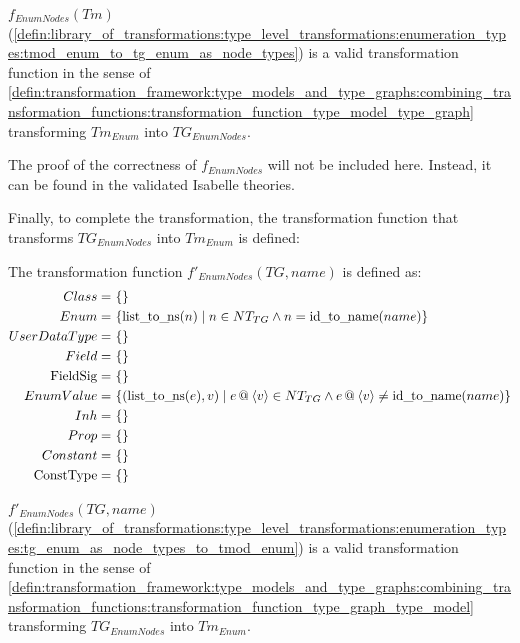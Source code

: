 \begin{thm}
\label{defin:library_of_transformations:type_level_transformations:enumeration_types:tmod_enum_to_tg_enum_as_node_types_func}
$f_{EnumNodes}(Tm)$ (\cref{defin:library_of_transformations:type_level_transformations:enumeration_types:tmod_enum_to_tg_enum_as_node_types}) is a valid transformation function in the sense of \cref{defin:transformation_framework:type_models_and_type_graphs:combining_transformation_functions:transformation_function_type_model_type_graph} transforming $Tm_{Enum}$ into $TG_{EnumNodes}$.
\end{thm}

The proof of the correctness of $f_{EnumNodes}$ will not be included here. Instead, it can be found in the validated Isabelle theories.

Finally, to complete the transformation, the transformation function that transforms $TG_{EnumNodes}$ into $Tm_{Enum}$ is defined:

\begin{defin}
\label{defin:library_of_transformations:type_level_transformations:enumeration_types:tg_enum_as_node_types_to_tmod_enum}
The transformation function $f'_{EnumNodes}(TG, name)$ is defined as:
\begin{align*}
Class =\ &\{\} \\
Enum =\ &\{\mathrm{list\_\!to\_\!ns}(n) \mid n \in NT_{TG} \land n = \mathrm{id\_\!to\_\!name}(name)\} \\
UserDataType =\ &\{\} \\
Field =\ &\{\} \\
\mathrm{FieldSig} =\ &\{\} \\
EnumValue =\ &\{(\mathrm{list\_\!to\_\!ns}(e), v) \mid e \append \langle v \rangle \in NT_{TG} \land e \append \langle v \rangle \neq \mathrm{id\_\!to\_\!name}(name) \} \\
Inh =\ &\{\} \\
Prop =\ &\{\} \\
Constant =\ &\{\} \\
\mathrm{ConstType} =\ &\{\}
\end{align*}
\end{defin}

\begin{thm}
\label{defin:library_of_transformations:type_level_transformations:enumeration_types:tg_enum_as_node_types_to_tmod_enum_func}
$f'_{EnumNodes}(TG, name)$ (\cref{defin:library_of_transformations:type_level_transformations:enumeration_types:tg_enum_as_node_types_to_tmod_enum}) is a valid transformation function in the sense of \cref{defin:transformation_framework:type_models_and_type_graphs:combining_transformation_functions:transformation_function_type_graph_type_model} transforming $TG_{EnumNodes}$ into $Tm_{Enum}$.
\end{thm}


